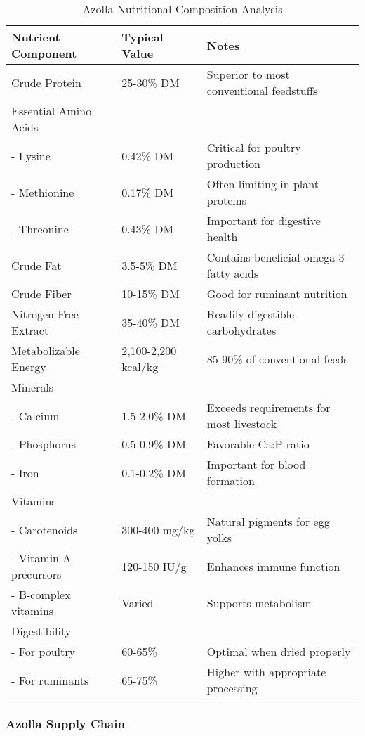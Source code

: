 \begin{table}[h]
\centering
\caption{Azolla Nutritional Composition Analysis}
\label{tab:azolla_nutrition}
\begin{tabular}{|p{4cm}|p{3cm}|p{5cm}|}
\hline
\textbf{Nutrient Component} & \textbf{Typical Value} & \textbf{Notes} \\
\hline
Crude Protein & 25-30\% DM & Superior to most conventional feedstuffs \\
\hline
Essential Amino Acids & & \\
- Lysine & 0.42\% DM & Critical for poultry production \\
- Methionine & 0.17\% DM & Often limiting in plant proteins \\
- Threonine & 0.43\% DM & Important for digestive health \\
\hline
Crude Fat & 3.5-5\% DM & Contains beneficial omega-3 fatty acids \\
\hline
Crude Fiber & 10-15\% DM & Good for ruminant nutrition \\
\hline
Nitrogen-Free Extract & 35-40\% DM & Readily digestible carbohydrates \\
\hline
Metabolizable Energy & 2,100-2,200 kcal/kg & 85-90\% of conventional feeds \\
\hline
Minerals & & \\
- Calcium & 1.5-2.0\% DM & Exceeds requirements for most livestock \\
- Phosphorus & 0.5-0.9\% DM & Favorable Ca:P ratio \\
- Iron & 0.1-0.2\% DM & Important for blood formation \\
\hline
Vitamins & & \\
- Carotenoids & 300-400 mg/kg & Natural pigments for egg yolks \\
- Vitamin A precursors & 120-150 IU/g & Enhances immune function \\
- B-complex vitamins & Varied & Supports metabolism \\
\hline
Digestibility & & \\
- For poultry & 60-65\% & Optimal when dried properly \\
- For ruminants & 65-75\% & Higher with appropriate processing \\
\hline
\end{tabular}
\end{table}

\subsubsection{Azolla Supply Chain}
\label{sec:azolla_supply}

